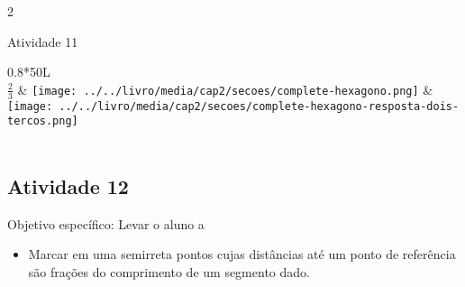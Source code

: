 \documentclass[oneside]{book}
\begin{document}
\begin{multicols}{2}
\begin{resposta*}{Atividade 11}
\begin{center}
\begin{tabulary}{0.8\textwidth}{*{50}{L}}
      \hline \\
        $\frac{2}{3}$  &   \texttt{[image: ../../livro/media/cap2/secoes/complete-hexagono.png]}  &   \texttt{[image: ../../livro/media/cap2/secoes/complete-hexagono-resposta-dois-tercos.png]}  \\
      \hline \\
    \end{tabulary}
  \end{center}
\end{resposta*}


\subsection{Atividade 12}



  Objetivo específico: Levar o aluno a

\begin{itemize} %
    \item       Marcar em uma semirreta pontos cujas distâncias até um ponto de referência são frações do comprimento de um segmento dado.
\end{itemize} %




\end{multicols}
\end{document}
